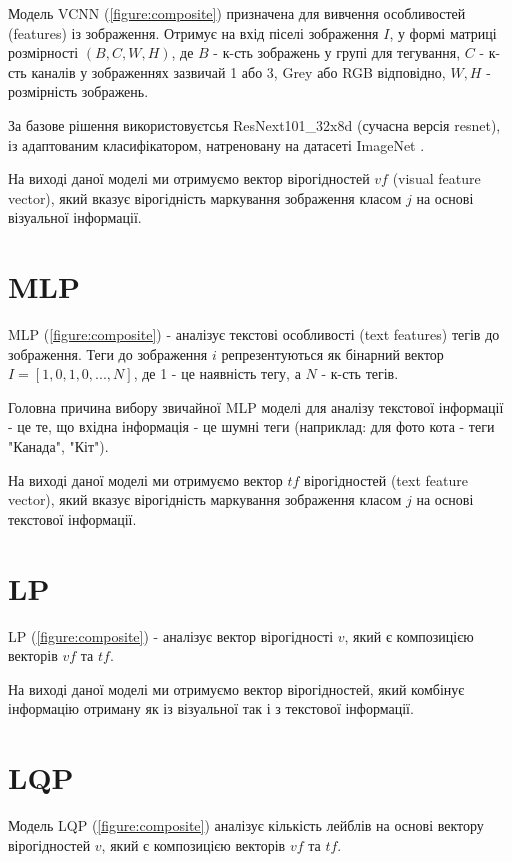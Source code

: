 \documentclass{udstu}
\begin{document}
Модель VCNN (\figurename{\ref{figure:composite}}) призначена для вивчення особливостей (features) із зображення.
Отримує на вхід піселі зображення $I$, у формі матриці розмірності $(B,C,W,H)$, де
$B$ - к-сть зображень у групі для тегування,
$C$ - к-сть каналів у зображеннях зазвичай 1 або 3, Grey або RGB відповідно,
$W,H$ - розмірність зображень.

За базове рішення використовуєтсья ResNext101\_32x8d \cite{resnext} (сучасна версія resnet),
із адаптованим класифікатором, натреновану на датасеті ImageNet \cite{deng2009imagenet}.

На виході даної моделі ми отримуємо вектор вірогідностей $vf$ (visual feature vector),
який вказує вірогідність маркування зображення класом $j$ на основі візуальної інформації.


\section{MLP}

MLP (\figurename{\ref{figure:composite}}) - аналізує текстові особливості (text features) тегів до зображення.
Теги до зображення $i$ репрезентуються як бінарний вектор $I = [1,0,1,0, ..., N]$,
де 1 - це наявність тегу, а $N$ - к-сть тегів.

Головна причина вибору звичайної MLP моделі для аналізу текстової інформації - це
те, що вхідна інформація - це шумні теги (наприклад: для фото кота - теги "Канада", "Кіт").

На виході даної моделі ми отримуємо вектор $tf$ вірогідностей (text feature vector),
який вказує вірогідність маркування зображення класом $j$ на основі текстової інформації.


\section{LP}

LP (\figurename{\ref{figure:composite}}) - аналізує вектор вірогідності $v$, який є композицією векторів $vf$ та $tf$.

На виході даної моделі ми отримуємо вектор вірогідностей, який комбінує інформацію отриману як із візуальної так і з
текстової інформації.


\section{LQP}

Модель LQP (\figurename{\ref{figure:composite}}) аналізує кількість лейблів на основі вектору вірогідностей $v$, який є композицією векторів $vf$ та $tf$.
\end{document}
